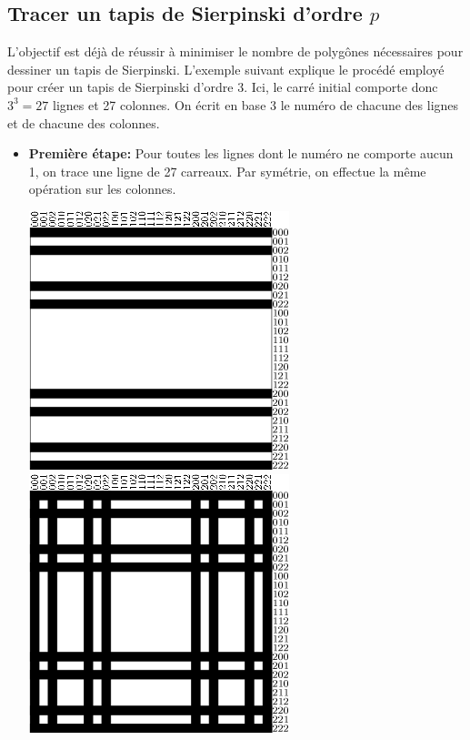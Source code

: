 \subsection{Tracer un tapis de Sierpinski d'ordre $p$}
L'objectif est déjà de réussir à minimiser le nombre de polygônes nécessaires pour dessiner un tapis de Sierpinski. L'exemple suivant explique le procédé employé pour créer un tapis de Sierpinski d'ordre 3. Ici, le carré initial comporte donc $3^3=27$ lignes et 27 colonnes. On écrit en base 3 le numéro de chacune des lignes et de chacune des colonnes.
\begin{itemize}
 \item [\textbullet]\textbf{Première étape:} Pour toutes les lignes dont le numéro ne comporte aucun 1, on trace une ligne de 27 carreaux. Par symétrie, on effectue la même opération sur les colonnes.\\
\begin{center}
\includegraphics{images/menger-schema02.png}
\includegraphics{images/menger-schema03.png}
\end{center}
\vspace{0.2cm}

\end{itemize}
